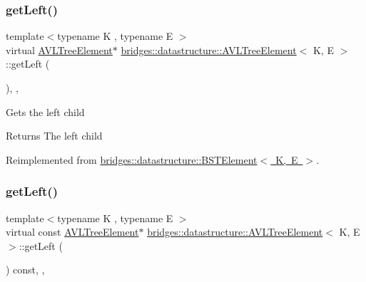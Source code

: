\subsubsection{\texorpdfstring{getLeft()}{getLeft()}\hspace{0.1cm}{\footnotesize\ttfamily [1/2]}}
{\footnotesize\ttfamily template$<$typename K , typename E $>$ \\
virtual \mbox{\hyperlink{classbridges_1_1datastructure_1_1_a_v_l_tree_element}{A\+V\+L\+Tree\+Element}}$\ast$ \mbox{\hyperlink{classbridges_1_1datastructure_1_1_a_v_l_tree_element}{bridges\+::datastructure\+::\+A\+V\+L\+Tree\+Element}}$<$ K, E $>$\+::get\+Left (\begin{DoxyParamCaption}{ }\end{DoxyParamCaption})\hspace{0.3cm}{\ttfamily [inline]}, {\ttfamily [override]}, {\ttfamily [virtual]}}

Gets the left child \begin{DoxyReturn}{Returns}
The left child 
\end{DoxyReturn}


Reimplemented from \mbox{\hyperlink{classbridges_1_1datastructure_1_1_b_s_t_element_af863c624691c11db26ae3b6d723d1f5c}{bridges\+::datastructure\+::\+B\+S\+T\+Element$<$ K, E $>$}}.

\mbox{\label{classbridges_1_1datastructure_1_1_a_v_l_tree_element_a4a639e0c623435aadf5c51ed132cb25d}} 
\subsubsection{\texorpdfstring{getLeft()}{getLeft()}\hspace{0.1cm}{\footnotesize\ttfamily [2/2]}}
{\footnotesize\ttfamily template$<$typename K , typename E $>$ \\
virtual const \mbox{\hyperlink{classbridges_1_1datastructure_1_1_a_v_l_tree_element}{A\+V\+L\+Tree\+Element}}$\ast$ \mbox{\hyperlink{classbridges_1_1datastructure_1_1_a_v_l_tree_element}{bridges\+::datastructure\+::\+A\+V\+L\+Tree\+Element}}$<$ K, E $>$\+::get\+Left (\begin{DoxyParamCaption}{ }\end{DoxyParamCaption}) const\hspace{0.3cm}{\ttfamily [inline]}, {\ttfamily [override]}, {\ttfamily [virtual]}}

